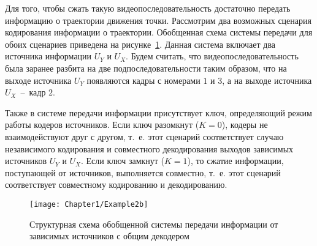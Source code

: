 Для того, чтобы сжать такую видеопоследовательность достаточно передать информацию о траектории движения точки. Рассмотрим два возможных сценария кодирования информации о траектории. Обобщенная схема системы передачи для обоих сценариев приведена на рисунке~\ref{fig:Example2b}. Данная система включает два источника информации $U_Y$ и $U_X$. Будем считать, что видеопоследовательность была заранее разбита на две подпоследовательности таким образом, что на выходе источника $U_Y$ появляются кадры с номерами $1$ и $3$, а на выходе источника $U_X$~–~кадр $2$.

Также в системе передачи информации присутствует ключ, определяющий режим работы кодеров источников. Если ключ разомкнут ($K=0$), кодеры не взаимодействуют друг с другом, т.~е. этот сценарий соответствует случаю независимого кодирования и совместного декодирования выходов зависимых источников $U_Y$ и $U_X$. Если ключ замкнут ($K=1$), то сжатие информации, поступающей от источников, выполняется совместно, т.~е. этот сценарий соответствует совместному кодированию и декодированию.

\begin{figure}[htbp]
\begin{center}
\texttt{[image: Chapter1/Example2b]}
\caption{Структурная схема обобщенной системы передачи информации от зависимых источников с общим декодером}
\label{fig:Example2b}
\end{center}
\end{figure}

